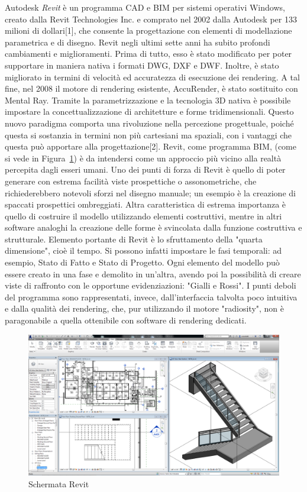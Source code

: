 Autodesk \emph{Revit} è un programma CAD e BIM per sistemi operativi Windows, creato dalla Revit Technologies Inc. e comprato nel 2002 dalla Autodesk per 133 milioni di dollari[1], che consente la progettazione con elementi di modellazione parametrica e di disegno.
Revit negli ultimi sette anni ha subito profondi cambiamenti e miglioramenti. Prima di tutto, esso è stato modificato per poter supportare in maniera nativa i formati DWG, DXF e DWF. Inoltre, è stato migliorato in termini di velocità ed accuratezza di esecuzione dei rendering. A tal fine, nel 2008 il motore di rendering esistente, AccuRender, è stato sostituito con Mental Ray.
Tramite la parametrizzazione e la tecnologia 3D nativa è possibile impostare la concettualizzazione di architetture e forme tridimensionali. Questo nuovo paradigma comporta una rivoluzione nella percezione progettuale, poiché questa si sostanzia in termini non più cartesiani ma spaziali, con i vantaggi che questa può apportare alla progettazione[2].
Revit, come programma BIM,  (come si vede in Figura~\ref{fig:revit}) è da intendersi come un approccio più vicino alla realtà percepita dagli esseri umani.
Uno dei punti di forza di Revit è quello di poter generare con estrema facilità viste prospettiche o assonometriche, che richiederebbero notevoli sforzi nel disegno manuale; un esempio è la creazione di spaccati prospettici ombreggiati. Altra caratteristica di estrema importanza è quello di costruire il modello utilizzando elementi costruttivi, mentre in altri software analoghi la creazione delle forme è svincolata dalla funzione costruttiva e strutturale. Elemento portante di Revit è lo sfruttamento della "quarta dimensione", cioè il tempo. Si possono infatti impostare le fasi temporali: ad esempio, Stato di Fatto e Stato di Progetto. Ogni elemento del modello può essere creato in una fase e demolito in un'altra, avendo poi la possibilità di creare viste di raffronto con le opportune evidenziazioni: "Gialli e Rossi". I punti deboli del programma sono rappresentati, invece, dall'interfaccia talvolta poco intuitiva e dalla qualità dei rendering, che, pur utilizzando il motore "radiosity", non è paragonabile a quella ottenibile con software di rendering dedicati.

\begin{figure}[htbp] %
   \centering
   \includegraphics[width=1\linewidth]{images/revit}
   \caption{Schermata Revit}
   \label{fig:revit}
   \end{figure}
   \newpage
